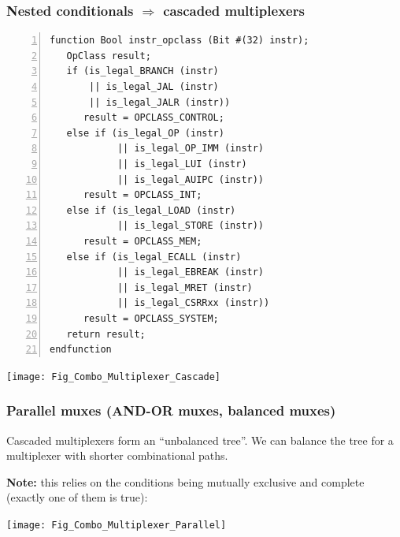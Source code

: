 \begin{frame}[fragile]
\frametitle{Nested conditionals $\Rightarrow$ cascaded multiplexers}

\begin{minipage}{0.3\textwidth}\tiny
\begin{Verbatim}[frame=single, numbers=left]
function Bool instr_opclass (Bit #(32) instr);
   OpClass result;
   if (is_legal_BRANCH (instr)
       || is_legal_JAL (instr)
       || is_legal_JALR (instr))
      result = OPCLASS_CONTROL;
   else if (is_legal_OP (instr)
            || is_legal_OP_IMM (instr)
            || is_legal_LUI (instr)
            || is_legal_AUIPC (instr))
      result = OPCLASS_INT;
   else if (is_legal_LOAD (instr)
            || is_legal_STORE (instr))
      result = OPCLASS_MEM;
   else if (is_legal_ECALL (instr)
            || is_legal_EBREAK (instr)
            || is_legal_MRET (instr)
            || is_legal_CSRRxx (instr))
      result = OPCLASS_SYSTEM;
   return result;
endfunction
\end{Verbatim}
\end{minipage}
\hm
\begin{minipage}{0.65\textwidth}
\begin{center}
 \texttt{[image: Fig\_Combo\_Multiplexer\_Cascade]}
\end{center}
\end{minipage}

\end{frame}


\begin{frame}[fragile]
\frametitle{Parallel muxes (AND-OR muxes, balanced muxes)}

\footnotesize

\begin{minipage}{0.25\textwidth}
 Cascaded multiplexers form an ``unbalanced tree''.  We can balance the tree
 for a multiplexer with shorter combinational paths.

 \vspace{2ex}

 {\bf Note:} this relies on the conditions being mutually exclusive and
 complete (exactly one of them is true):

\end{minipage}
\hm
\begin{minipage}{0.7\textwidth}
\begin{center}
 \texttt{[image: Fig\_Combo\_Multiplexer\_Parallel]}
\end{center}
\end{minipage}

\end{frame}


